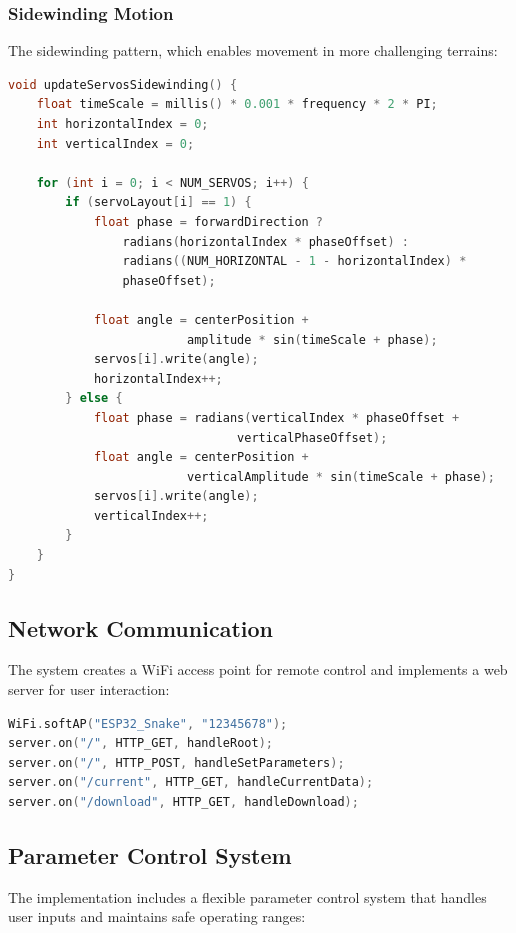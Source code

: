 \documentclass[12pt,a4paper]{report}
\begin{document}
\subsubsection{Sidewinding Motion}
The sidewinding pattern, which enables movement in more challenging terrains:

\begin{lstlisting}[language=C++]
void updateServosSidewinding() {
    float timeScale = millis() * 0.001 * frequency * 2 * PI;
    int horizontalIndex = 0;
    int verticalIndex = 0;

    for (int i = 0; i < NUM_SERVOS; i++) {
        if (servoLayout[i] == 1) {
            float phase = forwardDirection ? 
                radians(horizontalIndex * phaseOffset) : 
                radians((NUM_HORIZONTAL - 1 - horizontalIndex) * 
                phaseOffset);
            
            float angle = centerPosition + 
                         amplitude * sin(timeScale + phase);
            servos[i].write(angle);
            horizontalIndex++;
        } else {
            float phase = radians(verticalIndex * phaseOffset + 
                                verticalPhaseOffset);
            float angle = centerPosition + 
                         verticalAmplitude * sin(timeScale + phase);
            servos[i].write(angle);
            verticalIndex++;
        }
    }
}
\end{lstlisting}

\subsection{Network Communication}
The system creates a WiFi access point for remote control and implements a web server for user interaction:

\begin{lstlisting}[language=C++]
WiFi.softAP("ESP32_Snake", "12345678");
server.on("/", HTTP_GET, handleRoot);
server.on("/", HTTP_POST, handleSetParameters);
server.on("/current", HTTP_GET, handleCurrentData);
server.on("/download", HTTP_GET, handleDownload);
\end{lstlisting}

\subsection{Parameter Control System}
The implementation includes a flexible parameter control system that handles user inputs and maintains safe operating ranges:
\end{document}
